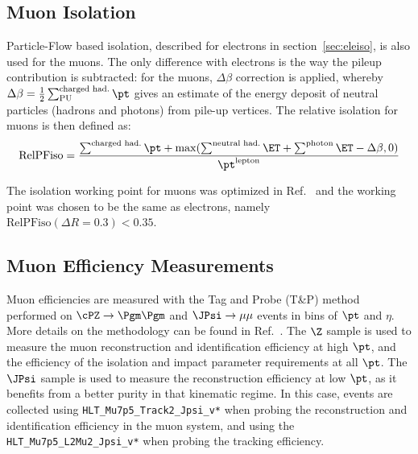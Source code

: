 \subsection{Muon Isolation}
\label{sec:muoniso}

Particle-Flow based isolation, described for electrons in section~\ref{sec:eleiso}, is also used for the muons. 
The only difference with electrons is the way the pileup contribution is subtracted: for the muons, $\Delta\beta$ correction is applied, whereby $\Delta\beta = \frac{1}{2} \sum^\text{charged had.}_\text{PU} \pt$  gives an estimate of the energy deposit of neutral particles (hadrons and photons) from pile-up vertices. 
The relative isolation for muons is then defined as:
\begin{equation}
\text{RelPFiso} = \frac{\sum^\text{charged had.} \pt + \max(\sum^\text{neutral had.} \ET 
+ \sum^\text{photon} \ET - \Delta \beta, 0)}{\pt^\text{lepton}}
\label{eqn:mupfiso}
\end{equation}

The isolation working point for muons was optimized in Ref.~\cite{AN-15-277} and the working point was chosen to be the same as electrons,
namely $\text{RelPFiso}(\Delta R = 0.3) < 0.35$. 


% 

\subsection{Muon Efficiency Measurements}
\label{sec:muonEffMeas}

Muon efficiencies are measured with the Tag and Probe (T\&P) method performed on
$\cPZ \to \Pgm\Pgm$ and $\JPsi\to\mu\mu$ events in bins of $\pt$ and $\eta$. More
details on the methodology can be found in Ref.~\cite{AN-15-277}.
%
The $\Z$ sample is used to measure the muon reconstruction and identification efficiency at high $\pt$,
and the efficiency of the isolation and impact parameter requirements at all $\pt$.
%
The $\JPsi$ sample is used to measure the reconstruction efficiency at low $\pt$,
as it benefits from a better purity in that kinematic regime. In this case,
events are collected using \verb=HLT_Mu7p5_Track2_Jpsi_v*= when probing the
reconstruction and identification efficiency in the muon system, and using the
 \verb=HLT_Mu7p5_L2Mu2_Jpsi_v*= when probing the tracking efficiency.

